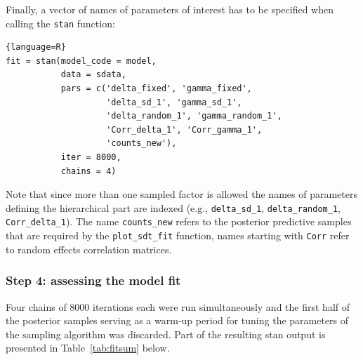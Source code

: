 \documentclass[oneside,a4paper]{article}
\begin{document}
Finally, a vector of names of parameters of interest has to be
specified when calling the \texttt{stan} function:

\begin{lstlisting}{language=R}
fit = stan(model_code = model,
           data = sdata,
           pars = c('delta_fixed', 'gamma_fixed',
                    'delta_sd_1', 'gamma_sd_1',
                    'delta_random_1', 'gamma_random_1',
                    'Corr_delta_1', 'Corr_gamma_1',
                    'counts_new'),
           iter = 8000,
           chains = 4)
\end{lstlisting}

Note that since more than one sampled factor is allowed the names of
parameters defining the hierarchical part are indexed (e.g.,
\texttt{delta\_sd\_1}, \texttt{delta\_random\_1},
\texttt{Corr\_delta\_1}). The name \texttt{counts\_new} refers to the
posterior predictive samples that are required by the
\texttt{plot\_sdt\_fit} function, names starting with \texttt{Corr}
refer to random effects correlation matrices.

\subsubsection{Step 4: assessing the model fit}

Four chains of 8000 iterations each were run simultaneously and the
first half of the posterior samples serving as a warm-up period for
tuning the parameters of the sampling algorithm was discarded. Part of
the resulting stan output is presented in Table~\ref{tab:fitsum}
below.
\end{document}
